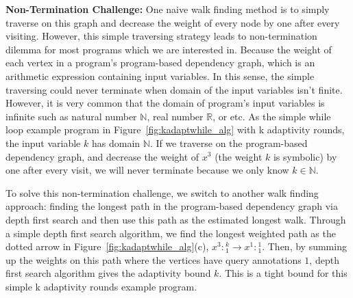 \textbf{Non-Termination Challenge:}
One naive walk finding method is to simply traverse on this graph and decrease the weight of every node by one after every visiting. However, this simple 
traversing strategy leads to non-termination dilemma for most programs which we are interested in. 
Because the weight of each vertex in a program's program-based dependency graph,
which is an arithmetic expression containing input variables. 
In this sense, the simple traversing could never terminate when domain of the input variables isn't finite.
However, it is very common that the domain of program's input variables is infinite such as natural number $\mathbb{N}$, real number $\mathbb{R}$, or etc. As the simple while loop example program in Figure~\ref{fig:kadaptwhile_alg} with k adaptivity rounds, the input variable $k$ has domain $\mathbb{N}$.
%
If we traverse on the program-based dependency graph, and decrease the weight of $x^3$ (the weight $k$ is symbolic) by one after every visit,
we will never terminate because we only know $k \in \mathbb{N}$.



To solve this non-termination challenge, we switch to another walk finding approach:
finding the longest path in the program-based dependency graph via depth first search and then use this path as the estimated longest walk.
Through a simple depth first search algorithm, we find the longest weighted path as the dotted arrow in Figure~\ref{fig:kadaptwhile_alg}(c),
$x^3: {}^k_1 \to x^1: {}^1_1 $.
Then, by summing up the weights on this path where the vertices have query annotations $1$, depth first search algorithm gives the adaptivity bound $k$.
This is a tight bound for this simple k adaptivity rounds example program.

